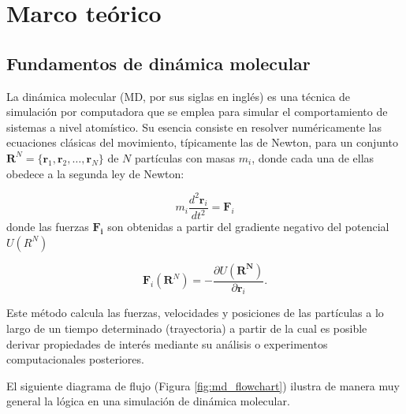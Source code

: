 \chapter{Marco teórico}

\section{Fundamentos de dinámica molecular}

La dinámica molecular (MD, por sus siglas en inglés) es una técnica de simulación por computadora que se emplea para simular el comportamiento de sistemas a nivel atomístico. Su esencia consiste en resolver numéricamente las ecuaciones clásicas del movimiento, típicamente las de Newton, para un conjunto $\mathbf{R}^N = \{ \mathbf{r}_1, \mathbf{r}_2, \dots, \mathbf{r}_N \}$ de $N$ partículas con masas $m_i$, donde cada una de ellas obedece a la segunda ley de Newton:

\begin{equation}
    \label{eq:newton_segunda_ley}
    m_i \frac{d^2 \mathbf{r}_i}{dt^2} = \mathbf{F}_i
\end{equation}
donde las fuerzas $\mathbf{F_i}$ son obtenidas a partir del gradiente negativo del potencial $U(R^N)$ 

\begin{equation}
    \label{eq:fuerza_potencial_sencilla}
    \mathbf{F}_i(\mathbf{R}^N) = - \frac{\partial U(\mathbf{R^N})}{\partial \mathbf{r}_i}.
\end{equation}


Este método calcula las fuerzas, velocidades y posiciones de las partículas a lo largo de un tiempo determinado (trayectoria) a partir de la cual es posible derivar propiedades de interés mediante su análisis o experimentos computacionales posteriores.

El siguiente diagrama de flujo (Figura \ref{fig:md_flowchart}) ilustra de manera muy general la lógica en una simulación de dinámica molecular.


